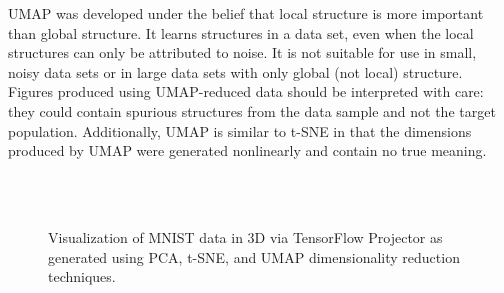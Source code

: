 UMAP was developed under the belief that local structure is more important than global structure. It learns structures in a data set, even when the local structures can only be attributed to noise. It is not suitable for use in small, noisy data sets or in large data sets with only global (not local) structure. Figures produced using UMAP-reduced data should be interpreted with care: they could contain spurious structures from the data sample and not the target population. Additionally, UMAP is similar to t-SNE in that the dimensions produced by UMAP were generated nonlinearly and contain no true meaning. 

\begin{figure}
\centering
{}
\\
\\
\caption{Visualization of MNIST data in 3D via TensorFlow Projector as generated using PCA, t-SNE, and UMAP dimensionality reduction techniques.}
\label{ch4:fig:data-viz}
\end{figure}

